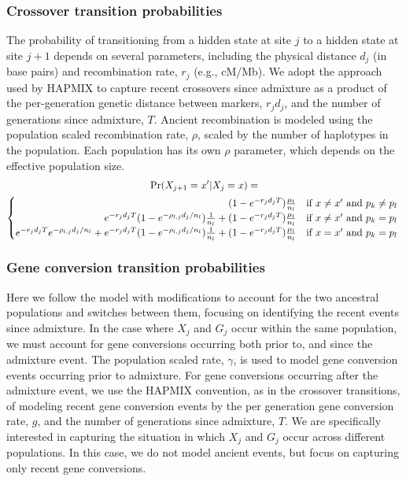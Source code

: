 \subsubsection*{Crossover transition probabilities}
The probability of transitioning from a hidden state at site $j$ to a hidden state at site $j+1$ depends on several parameters,
including the physical distance $d_j$ (in base pairs) and recombination rate, $r_j$ (e.g., cM/Mb).
We adopt the approach used by HAPMIX to capture recent crossovers since admixture as a product of the per-generation genetic distance between markers, $r_j d_j$, and the number of generations since admixture, $T$.
Ancient recombination is modeled using the population scaled recombination rate, $\rho$, scaled by the number of haplotypes in the population.
Each population has its own $\rho$ parameter, which depends on the effective population size.
%
\begin{multline}
     \Pr(X_{j+1}=x' | X_{j}=x) = \\
\begin{cases}
\hfill   (1-e^{-r_j d_j T}) \frac{\mu_l}{n_l}  
        &  \text{if $x \ne x'$ and $p_k \ne p_l$ } \\
\hfill e^{-r_j d_j T} (1-e^{-\rho_{l,j} d_j / n_l }) \frac{1}{n_l} + 
        (1-e^{-r_j d_j T}) \frac{\mu_l}{n_l}  
        &  \text{if $x \ne x'$ and $p_k = p_l$ } \\
        e^{-r_j d_j T} e^{-\rho_{l,j} d_j / n_l } +
        e^{-r_j d_j T} (1-e^{-\rho_{l,j} d_j / n_l }) \frac{1}{n_l} + 
        (1-e^{-r_j d_j T}) \frac{\mu_l}{n_l}
        &  \text{if $x=x'$ and $p_k = p_l$ } \\
\end{cases}
\end{multline}


\subsubsection*{Gene conversion transition probabilities}
Here we follow the \citet{Gay2007} model with modifications to account for the two ancestral populations and switches between them, focusing on identifying the recent events since admixture.
In the case where $X_j$ and $G_j$ occur within the same population, we must account for gene conversions occurring both prior to, and since the admixture event.
The population scaled rate, $\gamma$, is used to model gene conversion events occurring prior to admixture.
For gene conversions occurring after the admixture event, we use the HAPMIX convention, as in the crossover transitions, of modeling recent gene conversion events by the per generation gene conversion rate, $g$, and the number of generations since admixture, $T$.
We are specifically interested in capturing the situation in which $X_j$ and $G_j$ occur across different populations.
In this case, we do not model ancient events, but focus on capturing only recent gene conversions.

